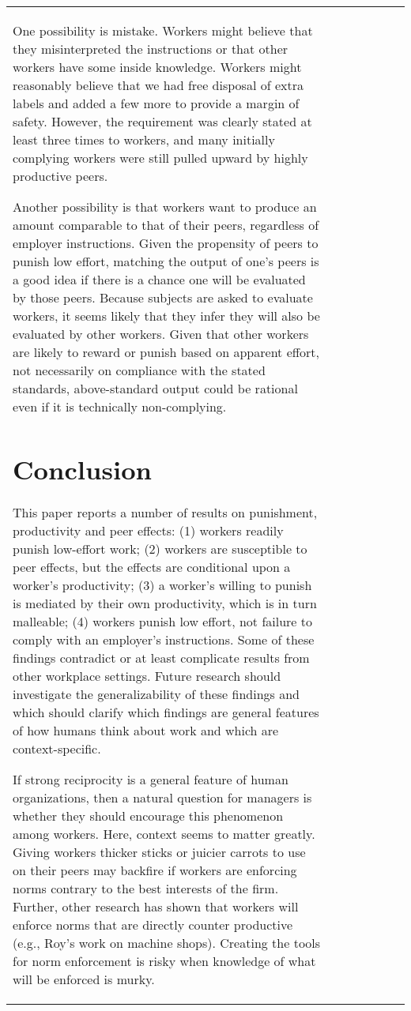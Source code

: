 \documentclass[12pt]{article}
\begin{document}
\begin{table}[h!]
\begin{center}
\begin{tabular}{lcccccc}
One possibility is mistake. Workers might believe that they
misinterpreted the instructions or that other workers have some inside
knowledge. Workers might reasonably believe that we had free disposal
of extra labels and added a few more to provide a margin of safety.
However, the requirement was clearly stated at least three times to
workers, and many initially complying workers were still pulled upward
by highly productive peers.

Another possibility is that workers want to produce an amount
comparable to that of their peers, regardless of employer
instructions. Given the propensity of peers to punish low effort,
matching the output of one's peers is a good idea if there is a chance
one will be evaluated by those peers. Because subjects are asked to
evaluate workers, it seems likely that they infer they will also be
evaluated by other workers. Given that other workers are likely to
reward or punish based on apparent effort, not necessarily on
compliance with the stated standards, above-standard output could be
rational even if it is technically non-complying.

\section{Conclusion} 
This paper reports a number of results on punishment, productivity and
peer effects: (1) workers readily punish low-effort work; (2) workers
are susceptible to peer effects, but the effects are conditional upon
a worker's productivity; (3) a worker's willing to punish is mediated
by their own productivity, which is in turn malleable; (4) workers
punish low effort, not failure to comply with an employer's
instructions. Some of these findings contradict or at least complicate
results from other workplace settings. Future research should
investigate the generalizability of these findings and which should
clarify which findings are general features of how humans think about
work and which are context-specific.

If strong reciprocity is a general feature of human organizations,
then a natural question for managers is whether they should encourage
this phenomenon among workers. Here, context seems to matter
greatly. Giving workers thicker sticks or juicier carrots to use on
their peers may backfire if workers are enforcing norms contrary to
the best interests of the firm. Further, other research has shown that
workers will enforce norms that are directly counter productive (e.g.,
Roy's \citeyear{roy1952quota} work on machine shops). Creating the
tools for norm enforcement is risky when knowledge of what will be
enforced is murky.


\end{tabular}
\end{center}
\end{table}
\end{document}
